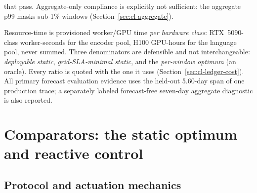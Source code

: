 \begin{description}
that pass. Aggregate-only compliance is explicitly not sufficient: the
aggregate p99 masks sub-1\% windows (Section~\ref{sec:cl-aggregate}).
\item[Denominators and scope.] Resource-time is provisioned worker/GPU time
\emph{per hardware class}: RTX~5090-class worker-seconds for the encoder pool,
H100 GPU-hours for the language pool, never summed. Three denominators are
defensible and not interchangeable: \emph{deployable static},
\emph{grid-SLA-minimal static}, and the \emph{per-window optimum} (an oracle).
Every ratio is quoted with the one it uses
(Section~\ref{sec:cl-ledger-cost}). All primary forecast evaluation
evidence uses the held-out 5.60-day span of one production trace; a
separately labeled forecast-free seven-day aggregate diagnostic is also
reported.
\end{description}

\makeatletter
\let\cl@svsectionmark\sectionmark
\let\sectionmark\@gobble
\section{Comparators: the static optimum and reactive control}
\let\sectionmark\cl@svsectionmark
\makeatother
{}
\label{sec:cl-comparators}

\subsection{Protocol and actuation mechanics}
\label{sec:base-protocol}

